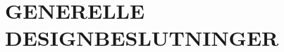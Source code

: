 \documentclass[Main.tex]{subfiles}
\begin{document}
\section{GENERELLE DESIGNBESLUTNINGER}
\end{document}
